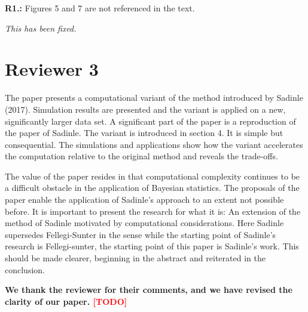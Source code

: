 \documentclass[letterpaper, parskip]{scrartcl}
\newcommand{\pointRaised}[2]{%
	\textbf{#1.\theresponsectr:} #2
}
\newcounter{responsectr}[section]     %
\newcommand{\reply}[1]{%
	\refstepcounter{responsectr}%
		\begin{tcolorbox}
			\itshape #1
		\end{tcolorbox}
}
\newcommand{\todo}{\textcolor{red}{[TODO]}\xspace}
\begin{document}
\pointRaised{R1}{%
	Figures 5 and 7 are not referenced in the text.
}
\reply{%
	This has been fixed.
}

	\clearpage
	\newpage

	\section*{Reviewer 3}
	\setcounter{responsectr}{0}

	The paper presents a computational variant of the method introduced by Sadinle (2017). Simulation results are presented and the variant is applied on a new, significantly larger data set. A significant part of the paper is a reproduction of the paper of Sadinle. The variant is introduced in section 4. It is simple but consequential. The simulations and applications show how the variant accelerates the computation relative to the original method and reveals the trade-offs.
	
	The value of the paper resides in that computational complexity continues to be a difficult obstacle in the application of Bayesian statistics. The proposals of the paper enable the application of Sadinle’s approach to an extent not possible before. It is important to present the research for what it is: An extension of the method of Sadinle motivated by computational considerations. Here Sadinle supersedes Fellegi-Sunter in the sense while the starting point of Sadinle’s research is Fellegi-sunter, the starting point of this paper is Sadinle’s work. This should be made clearer, beginning in the abstract and reiterated in the conclusion.

	\textbf{We thank the reviewer for their comments, and we have revised the clarity of our paper. \todo}
\end{document}
